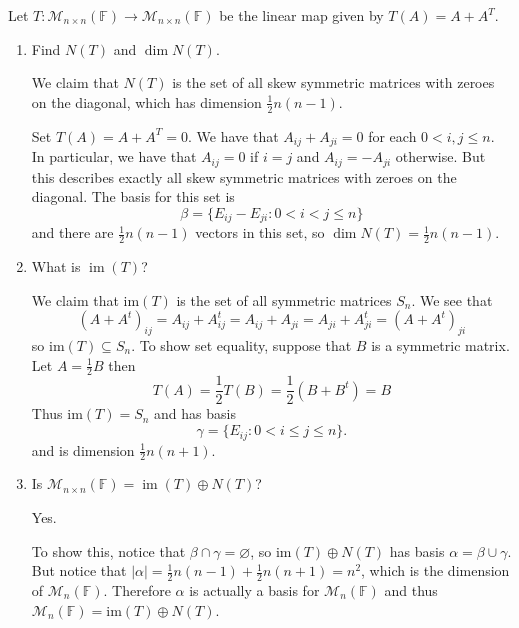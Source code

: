 \documentclass{eh-homework}
\begin{document}
    \newpage
    \begin{question}{5}
        Let \( T : \mathcal{M}_{n \times n}(\mathbb{F}) \to \mathcal{M}_{n \times n}(\mathbb{F}) \) be the linear map given by \( T(A) = A + A^T \).

        \begin{enumerate}[label=(\alph*)]
            \item Find \( N(T) \) and \( \dim N(T) \).
            
            We claim that \(N(T)\) is the set of all skew symmetric matrices with zeroes on the diagonal, which has dimension \(\frac{1}{2}n(n-1)\).
            
            Set \(T(A) = A + A^T = 0\). We have that \(A_{ij} + A_{ji} = 0\) for each \(0 < i,j \leq n\). In particular, we have that \(A_{ij} = 0\) if \(i = j\) and \(A_{ij} = -A_{ji}\) otherwise. But this describes exactly all skew symmetric matrices with zeroes on the diagonal. The basis for this set is
            \[
                \beta = \{ E_{ij} - E_{ji} : 0 < i < j \leq n \}
            \]
            and there are \(\frac{1}{2}n(n-1)\) vectors in this set, so \(\dim N(T) = \frac{1}{2}n(n-1)\).
            \item What is \( \operatorname{im}(T) \)?
            
            We claim that \(\mathrm{im} (T)\) is the set of all symmetric matrices \(S_n\). We see that
            \[
                (A + A^t)_{ij} = A_{ij} + A^t_{ij} = A_{ij} + A_{ji} = A_{ji} + A^t_{ji} = (A + A^t)_{ji}
            \]
            so \(\mathrm{im} (T) \subseteq S_n\). To show set equality, suppose that \(B\) is a symmetric matrix. Let \(A = \frac{1}{2}B\) then
            \[
                T(A) = \frac{1}{2}T(B) = \frac{1}{2}(B + B^t) = B
            \]
            Thus \(\mathrm{im} (T) = S_n\) and has basis
            \[
                \gamma = \{ E_{ij} : 0 < i \leq j \leq n \}.
            \]
            and is dimension \(\frac{1}{2}n(n+1)\).
            \item Is \( \mathcal{M}_{n \times n}(\mathbb{F}) = \operatorname{im}(T) \oplus N(T) \)?
            
            Yes.

            To show this, notice that \(\beta \cap \gamma = \varnothing\), so \(\mathrm{im} (T) \oplus N(T)\) has basis \(\alpha = \beta \cup \gamma\). But notice that \(|\alpha| = \frac{1}{2}n(n-1) + \frac{1}{2}n(n+1) = n^2\), which is the dimension of \(\mathcal{M} _n(\mathbb{F})\). Therefore \(\alpha\) is actually a basis for \(\mathcal{M} _n(\mathbb{F})\) and thus \(\mathcal{M} _n(\mathbb{F}) = \mathrm{im} (T) \oplus N(T)\).
        \end{enumerate}
    \end{question}
\end{document}
